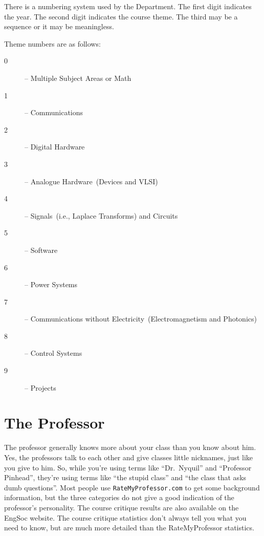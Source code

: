 \documentclass{book}
\begin{document}
There is a numbering system used by the Department. The first digit indicates the year. The second digit indicates the course theme. The third may be a sequence or it may be meaningless.

Theme numbers are as follows:
\begin{description}
\item[0] -- Multiple Subject Areas or Math
\item[1] -- Communications
\item[2] -- Digital Hardware
\item[3] -- Analogue Hardware~(Devices and VLSI)
\item[4] -- Signals~(i.e., Laplace Transforms) and Circuits
\item[5] -- Software
\item[6] -- Power Systems
\item[7] -- Communications without Electricity~(Electromagnetism and Photonics)
\item[8] -- Control Systems
\item[9] -- Projects
\end{description}

\section{The Professor}
The professor generally knows more about your class than you know about him. Yes, the professors talk to each other and give classes little nicknames, just like you give to him. So, while you're using terms like ``Dr.~Nyquil'' and ``Professor Pinhead'', they're using terms like ``the stupid class'' and ``the class that asks dumb questions''. Most people use \texttt{RateMyProfessor.com} to get some background information, but the three categories do not give a good indication of the professor's personality. The course critique results are also available on the EngSoc website. The course critique statistics don't always tell you what you need to know, but are much more detailed than the RateMyProfessor statistics.


\end{document}
